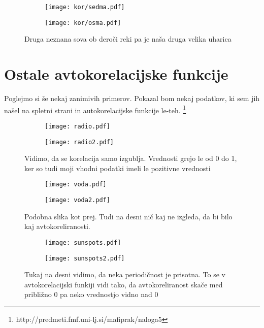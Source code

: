 \documentclass{article}
\begin{document}
\begin{figure}[H]
\begin{subfigure}{.5\textwidth}
\texttt{[image: kor/sedma.pdf]}
\end{subfigure}
\begin{subfigure}{.5\textwidth}
\texttt{[image: kor/osma.pdf]}
\end{subfigure}
\caption*{Druga neznana sova ob deroči reki pa je naša druga velika uharica}
\end{figure}

\section{Ostale avtokorelacijske funkcije}
Poglejmo si še nekaj zanimivih primerov. Pokazal bom nekaj podatkov, ki sem jih našel na spletni strani in autokorelacijske funkcije le-teh.
\footnote{\label{tukaj}http://predmeti.fmf.uni-lj.si/mafiprak/naloga5}

\begin{figure}[H]
\begin{subfigure}{.5\textwidth}
\texttt{[image: radio.pdf]}
\end{subfigure}
\begin{subfigure}{.5\textwidth}
\texttt{[image: radio2.pdf]}
\end{subfigure}
\caption*{Vidimo, da se korelacija samo izgublja. Vrednosti grejo le od 0 do 1, ker so tudi moji vhodni podatki imeli le pozitivne vrednosti}
\end{figure}

\begin{figure}[H]
\begin{subfigure}{.5\textwidth}
\texttt{[image: voda.pdf]}
\end{subfigure}
\begin{subfigure}{.5\textwidth}
\texttt{[image: voda2.pdf]}
\end{subfigure}
\caption*{Podobna slika kot prej. Tudi na desni nič kaj ne izgleda, da bi bilo kaj avtokoreliranosti.}
\end{figure}


\begin{figure}[H]
\begin{subfigure}{.5\textwidth}
\texttt{[image: sunspots.pdf]}
\end{subfigure}
\begin{subfigure}{.5\textwidth}
\texttt{[image: sunspots2.pdf]}
\end{subfigure}
\caption*{Tukaj na desni vidimo, da neka periodičnost je prisotna. To se v avtokorelacijski funkiji vidi tako, da avtokoreliranost skače med približno 0 pa neko vrednostjo vidno nad 0}
\end{figure}
\end{document}
